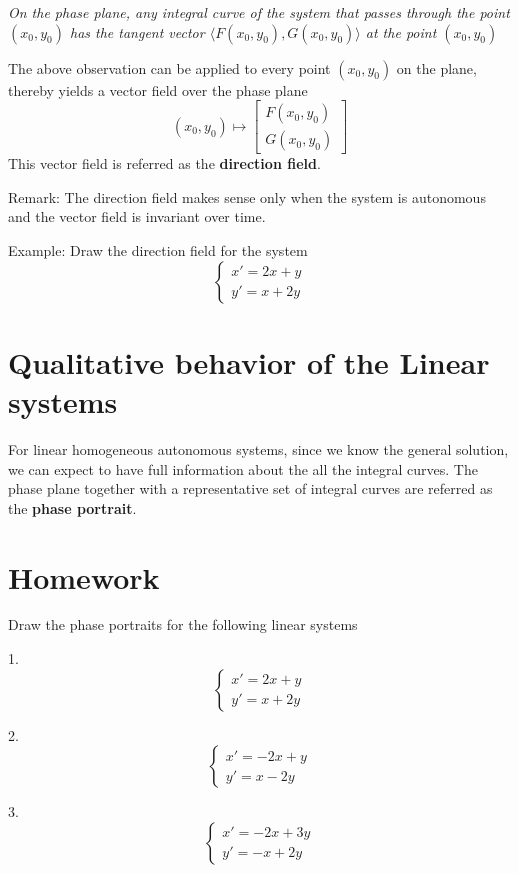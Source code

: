 \documentclass[11pt]{article}
\begin{document}
\textit{On the phase plane, any integral curve of the system that passes through the point $(x_0,y_0)$ has the tangent vector $\langle F(x_0, y_0), G(x_0, y_0)\rangle$ at the point $(x_0, y_0)$}

The above observation can be applied to every point $(x_0, y_0)$ on the plane, thereby yields a vector field over the phase plane
$$(x_0, y_0)\mapsto \left[\begin{array}{l}
F(x_0, y_0)\\
G(x_0, y_0)
\end{array}\right]$$
This vector field is referred as the \textbf{direction field}. 

Remark: The direction field makes sense only when the system is autonomous and the vector field is invariant over time. 

Example: Draw the direction field for the system
$$\left\{\begin{array}{l}
x' = 2x + y\\
y' = x + 2y
\end{array}\right.$$

\section{Qualitative behavior of the Linear systems}

For linear homogeneous autonomous systems, since we know the general solution, we can expect to have full information about the all the integral curves. The phase plane together with a representative set of integral curves are referred as the \textbf{phase portrait}. 


\newpage

\section*{Homework}

Draw the phase portraits for the following linear systems

1. $$\left\{\begin{array}{l}
x' = 2x + y\\
y' = x + 2y
\end{array}\right.$$

2. $$\left\{\begin{array}{l}
x' = -2x + y\\
y' = x -2y
\end{array}\right.$$

3. $$\left\{\begin{array}{l}
x' = -2x + 3y\\
y' = -x + 2y
\end{array}\right.$$
\end{document}
